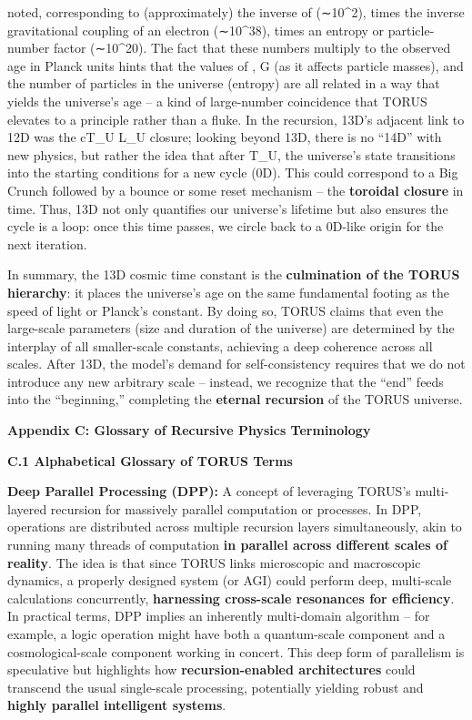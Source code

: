 \documentclass[
]{article}
\begin{document}
noted\hspace{0pt}, corresponding to (approximately) the inverse of \alpha
(∼10\^{}2), times the inverse gravitational coupling of an electron
(∼10\^{}38), times an entropy or particle-number factor (∼10\^{}20). The
fact that these numbers multiply to the observed age in Planck units
hints that the values of \alpha, G (as it affects particle masses), and the
number of particles in the universe (entropy) are all related in a way
that yields the universe's age -- a kind of large-number coincidence
that TORUS elevates to a principle rather than a fluke\hspace{0pt}. In
the recursion, 13D's adjacent link to 12D was the cT\_U \approx L\_U closure;
looking beyond 13D, there is no ``14D'' with new physics, but rather the
idea that after T\_U, the universe's state transitions into the starting
conditions for a new cycle (0D)\hspace{0pt}. This could correspond to a
Big Crunch followed by a bounce or some reset mechanism -- the
\textbf{toroidal closure} in time. Thus, 13D not only quantifies our
universe's lifetime but also ensures the cycle is a loop: once this time
passes, we circle back to a 0D-like origin for the next iteration.

In summary, the 13D cosmic time constant is the \textbf{culmination of
the TORUS hierarchy}: it places the universe's age on the same
fundamental footing as the speed of light or Planck's constant. By doing
so, TORUS claims that even the large-scale parameters (size and duration
of the universe) are determined by the interplay of all smaller-scale
constants, achieving a deep coherence across all scales. After 13D, the
model's demand for self-consistency requires that we do not introduce
any new arbitrary scale -- instead, we recognize that the ``end'' feeds
into the ``beginning,'' completing the \textbf{eternal recursion} of the
TORUS universe\hspace{0pt}.

\textbf{Appendix C: Glossary of Recursive Physics Terminology}

\textbf{C.1 Alphabetical Glossary of TORUS Terms}

\textbf{Deep Parallel Processing (DPP):} A concept of leveraging TORUS's
multi-layered recursion for massively parallel computation or processes.
In DPP, operations are distributed across multiple recursion layers
simultaneously, akin to running many threads of computation \textbf{in
parallel across different scales of reality}. The idea is that since
TORUS links microscopic and macroscopic dynamics, a properly designed
system (or AGI) could perform deep, multi-scale calculations
concurrently, \textbf{harnessing cross-scale resonances for
efficiency}\hspace{0pt}. In practical terms, DPP implies an inherently
multi-domain algorithm -- for example, a logic operation might have both
a quantum-scale component and a cosmological-scale component working in
concert\hspace{0pt}. This deep form of parallelism is speculative but
highlights how \textbf{recursion-enabled architectures} could transcend
the usual single-scale processing, potentially yielding robust and
\textbf{highly parallel intelligent systems}.
\end{document}

